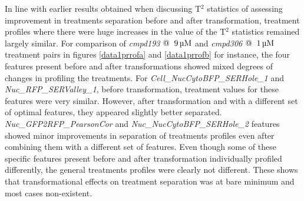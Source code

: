 \documentclass[11pt]{article}
\begin{document}
\par{In line with earlier results obtained when discussing T$^2$ statistics of assessing improvement in treatments separation before and after transformation, treatment profiles where there were huge increases in the value of the T$^2$ statistics remained largely similar. For comparison of \textit{cmpd193} $@ \hspace{2mm} \SI{9}{\micro M}$ and \textit{cmpd306} $@ \hspace{2mm} \SI{1}{\micro M}$ treatment pairs in figures \ref{data1prrofa} and \ref{data1prrofb} for instance, the four features present before and after transformations showed mixed degrees of changes in profiling the treatments. For \textit{Cell\_NucCytoBFP\_SERHole\_1} and \textit{Nuc\_RFP\_SERValley\_1}, before transformation, treatment values for these features were very similar. However, after transformation and with a different set of optimal features, they appeared slightly better separated. \textit{Nuc\_GFP2RFP\_PearsonCor} and \textit{Nuc\_NucCytoBFP\_SERHole\_2} features showed minor improvements in separation of treatments profiles even after combining them with a different set of features. Even though some of these specific features present before and after transformation individually profiled differently, the general treatments profiles were clearly not different. These shows that transformational effects on treatment separation was at bare minimum and most cases non-existent. }
\end{document}
